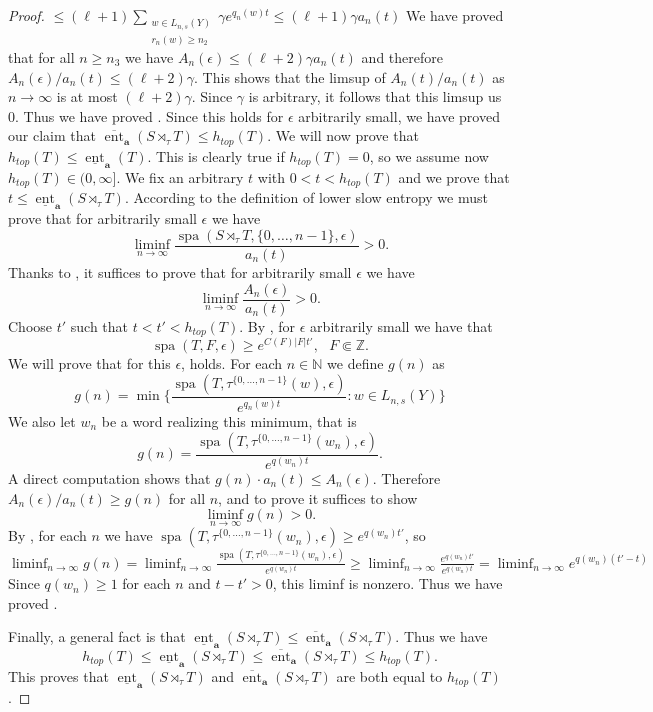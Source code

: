 \documentclass[10pt,a4paper]{amsart}
\newcommand{\N}{\mathbb{N}}
\newcommand{\Z}{\mathbb{Z}}
\newcommand{\lowerent}{\underline{\operatorname{ent}}}
\newcommand{\spa}{\operatorname{spa}}
\newcommand{\upperent}{\overline{\operatorname{ent}}}
\begin{document}
\begin{proof}
    \(
    \leq (\ell+1) \sum_{\substack{w\in L_{n,s}(Y)\\ r_n(w)\geq  n_2}} \gamma e^{q_n(w)t}
    \leq (\ell+1)\gamma a_n(t)
    \)
    We have proved that for all $n\geq n_3$ we have  $A_n(\epsilon)\leq (\ell+2) \gamma a_n(t)$ and therefore $A_n(\epsilon)/a_n(t)\leq (\ell+2) \gamma$. This shows that the limsup of $A_n(t)/a_n(t)$ as $n\to\infty$ is at most $(\ell+2) \gamma$. Since $\gamma$ is arbitrary, it follows that this limsup us $0$. Thus we have proved . Since this holds for  $\epsilon$ arbitrarily small, we have proved our claim that $\upperent_{\textbf{a}}(S\rtimes_\tau T)\leq h_{top}(T)$. 
    We will now prove that $h_{top}(T)\leq \lowerent_{\textbf{a}}(T)$. This is clearly true if $h_{top}(T)=0$, so we assume now $h_{top}(T)\in (0,\infty]$. We fix an arbitrary $t$ with $0<t<h_{top}(T)$ and we prove that $t\leq \lowerent_{\textbf{a}}(S\rtimes_\tau T)$. According to the definition of lower slow entropy we must prove that for arbitrarily small $\epsilon$ we have
    \[\liminf_{n\to\infty} \frac{\spa(S\rtimes_\tau T,\{0,\dots,n-1\},\epsilon)}{a_n(t)}>0.\]
    Thanks to , it suffices to prove that for arbitrarily small $\epsilon$ we have \begin{equation}\label{liminf}\liminf_{n\to\infty} \frac{A_n(\epsilon)}{a_n(t)}>0.\end{equation}
    Choose $t'$ such that $t<t'<h_{top}(T)$. By , for $\epsilon$ arbitrarily small we have that
    \begin{equation}\label{lower-bound-spa}
    \spa(T,F,\epsilon)\geq e^{C(F)|F|t'}, \ \ \ F\Subset \Z.
    \end{equation}
    We will prove that for this $\epsilon$,  holds. For each $n\in\N$ we define $g(n)$ as 
    \[g(n)=\min \{\frac{\spa(T,\tau^{\{0,\dots,n-1\}}(w),\epsilon)}{e^{q_n(w)t}} : w\in L_{n,s}(Y)\}\]
    We also let $w_n$ be a word realizing this minimum, that is \[g(n)=\frac{\spa(T,\tau^{\{0,\dots,n-1\}}(w_n),\epsilon)}{e^{q(w_n)t}}.\]
    A direct computation shows that  $g(n)\cdot a_n(t)\leq A_n(\epsilon)$. Therefore $A_n(\epsilon)/a_n(t)\geq g(n)$ for all $n$, and to prove  it suffices to show
    \[\liminf_{n\to\infty} g(n)>0.\]
    By ,  for each $n$ we have $\spa(T,\tau^{\{0,\dots,n-1\}}(w_n),\epsilon)\geq e^{q(w_n)t'}$, so
\(\liminf_{n\to\infty} g(n)=\liminf_{n\to\infty} \frac{\spa(T,\tau^{\{0,\dots,n-1\}}(w_n),\epsilon)}{e^{q(w_n)t}}\geq \liminf_{n\to\infty} \frac{e^{q(w_n)t'}}{e^{q(w_n)t}}
=\liminf_{n\to\infty}e^{q(w_n)(t'-t)}
\)
Since $q(w_n)\geq 1$ for each $n$ and $t-t'>0$, this liminf is nonzero.  Thus we have proved . 


Finally, a general fact is that $\lowerent_{\textbf{a}}(S\rtimes_\tau T)\leq \upperent_{\textbf{a}}(S\rtimes_\tau T)$. Thus we have
\[h_{top}(T)\leq \lowerent_{\textbf{a}}(S\rtimes_\tau T)\leq \upperent_{\textbf{a}}(S\rtimes_\tau T)\leq h_{top}(T).\]
This proves that $\lowerent_{\textbf{a}}(S\rtimes_\tau T)$ and $\upperent_{\textbf{a}}(S\rtimes_\tau T)$ are both equal to $h_{top}(T)$.
\end{proof}
\end{document}
